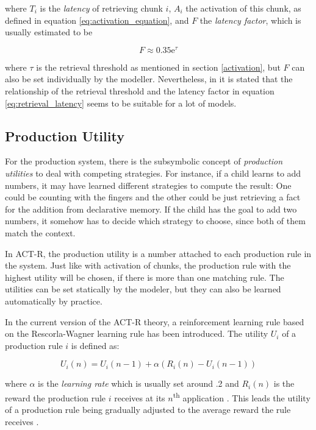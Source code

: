 where $T_i$ is the \emph{latency} of retrieving chunk $i$, $A_i$ the activation of this chunk, as defined in equation \eqref{eq:activation_equation}, and $F$ the \emph{latency factor}, which is usually estimated to be

\begin{equation}
F \approx 0.35\mathrm{e}^\tau
\end{equation}

where $\tau$ is the retrieval threshold as mentioned in section \ref{activation}, but $F$ can also be set individually by the modeller. Nevertheless, in \cite[1042]{anderson_integrated_2004} it is stated that the relationship of the retrieval threshold and the latency factor in equation \eqref{eq:retrieval_latency} seems to be suitable for a lot of models.

\subsection{Production Utility}
\label{production_utility}

For the production system, there is the subsymbolic concept of \emph{production utilities} to deal with competing strategies. For instance, if a child learns to add numbers, it may have learned different strategies to compute the result: One could be counting with the fingers and the other could be just retrieving a fact for the addition from declarative memory. If the child has the goal to add two numbers, it somehow has to decide which strategy to choose, since both of them match the context.

In ACT-R, the production utility is a number attached to each production rule in the system. Just like with activation of chunks, the production rule with the highest utility will be chosen, if there is more than one matching rule. The utilities can be set statically by the modeler, but they can also be learned automatically by practice.

In the current version of the ACT-R theory, a reinforcement learning rule based on the Rescorla-Wagner learning rule \cite{rescorla_wagner_1972} has been introduced. The utility $U_i$ of a production rule $i$ is defined as:

\begin{equation}
\label{eq:utility_learning}
U_i(n) = U_i(n - 1) + \alpha \left(R_i(n) - U_i(n - 1)\right)
\end{equation}

where $\alpha$ is the \emph{learning rate} which is usually set around .2 and $R_i(n)$ is the reward the production rule $i$ receives at its $n$\textsuperscript{th} application \cite[160--161]{anderson_how_2007}. This leads the utility of a production rule being gradually adjusted to the average reward the rule receives \cite[6--7]{actr_tutorial}. 

